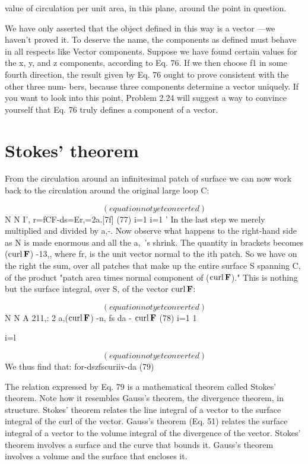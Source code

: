value of circulation per unit area, in this plane, around the point in
question.

  
 

We have only asserted that the object defined in this way is a vector
---we haven't proved it. To deserve the name, the components as
defined must behave in all respects like Vector components. Suppose
we have found certain values for the x, y, and z components, according
to Eq. 76. If we then choose f1 in some fourth direction, the result
given by Eq. 76 ought to prove consistent with the other three num-
bers, because three components determine a vector uniquely. If you
want to look into this point, Problem 2.24 will suggest a way to convince
yourself that Eq. 76 truly defines a component of a vector.

\section{Stokes' theorem}

From the circulation around an infinitesimal patch of surface we
can now work back to the circulation around the original large
loop C:

\begin{equation}
(equation not yet converted)
\end{equation}
N N I',
r=fCF-ds=Er,=2a.[7f] (77)
i=1 i=1 '
In the last step we merely multiplied and divided by a,-. Now observe
what happens to the right-hand side as N is made enormous and all
the a,~'s shrink. The quantity in brackets becomes ($\operatorname{curl}\mathbf{F}$) -13,,
where fr, is the unit vector normal to the ith patch. So we have on
the right the sum, over all patches that make up the entire surface S
spanning C, of the product "patch area times normal component of
($\operatorname{curl}\mathbf{F}$)." This is nothing but the surface integral, over S, of the
vector $\operatorname{curl}\mathbf{F}$:

\begin{equation}
(equation not yet converted)
\end{equation}
N  N A
211,: 2 a,($\operatorname{curl}\mathbf{F}$) -n, \rightarrow fs da - $\operatorname{curl}\mathbf{F}$ (78)
i=1 1

i=l

\begin{equation}
(equation not yet converted)
\end{equation}
We thus find that:
for-dszfscuriiv-da (79)

The relation expressed by Eq. 79 is a mathematical theorem called
Stokes' theorem. Note how it resembles Gauss's theorem, the divergence
theorem, in structure. Stokes' theorem relates the line integral
of a vector to the surface integral of the curl of the vector. Gauss's
theorem (Eq. 51) relates the surface integral of a vector to the volume
integral of the divergence of the vector. Stokes' theorem involves
a surface and the curve that bounds it. Gauss's theorem involves a
volume and the surface that encloses it.

